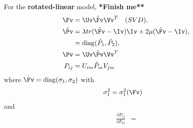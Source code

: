 For the {\bf rotated-linear} model, {\bf **Finish me**}
\begin{align}
  \Fv &= \Uv \Fvhat \Vv^T \quad{(SVD)} ,  \\
  \Pvhat &= \lambda tr(\Fvhat-\Iv)\Iv + 2\mu( \Fvhat -\Iv), \\ 
         &= \diag(\Phat_1,\Phat_2), \\
  \Pv &= \Uv \Pvhat \Vv^T \\
  P_{ij} &= U_{im} \Phat_m V_{jm}
\end{align}
where $\Fvhat=\diag(\sigma_1,\sigma_2)$ with
\begin{align}
   \sigma_1^2 &= \sigma_1^2(\Fv)
\end{align}
and
\begin{align}
   \frac{\partial P_{ij}}{\partial F_{kl}} &= 
\end{align}
